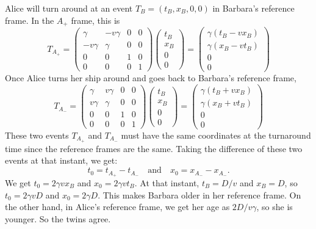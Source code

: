\documentclass{../../templates/lkx_pset}
\begin{document}
\begin{parts}
	Alice will turn around at an event $T_B = (t_B, x_B, 0, 0)$ in Barbara's reference frame. In the $A_+$ frame, this is 
	\[
		T_{A_+} = \begin{pmatrix}
				\gamma   & -v\gamma & 0 & 0 \\
				-v\gamma & \gamma   & 0 & 0 \\
				0        & 0        & 1 & 0 \\
				0        & 0        & 0 & 1
				\end{pmatrix}\begin{pmatrix} t_B\\x_B\\0\\0\end{pmatrix} = \begin{pmatrix}\gamma (t_B - v x_B)\\  \gamma (x_B - v t_B)\\0\\0\end{pmatrix}
	\]
	Once Alice turns her ship around and goes back to Barbara's reference frame, 
	\[
		T_{A_-} = \begin{pmatrix}
				\gamma   & v\gamma & 0 & 0 \\
				v\gamma & \gamma   & 0 & 0 \\
				0        & 0        & 1 & 0 \\
				0        & 0        & 0 & 1
				\end{pmatrix}\begin{pmatrix} t_B\\x_B\\0\\0\end{pmatrix} = \begin{pmatrix}\gamma (t_B + v x_B)\\  \gamma (x_B + v t_B)\\0\\0\end{pmatrix}
	\]
	These two events $T_{A_+}$ and $T_{A_-}$ must have the same coordinates at the turnaround time since the reference frames are the same. Taking the difference of these two events at that instant, we get:
	\[
		t_0 = t_{A_+} - t_{A_-} \quad\textrm{and}\quad x_0 = x_{A_-} - x_{A_-}.
	\]
	We get $t_0 = 2\gamma v x_B$ and $x_0=2\gamma v t_B$. At that instant, $t_B= D/v$ and $x_B = D$, so $t_0 = 2\gamma vD$ and $x_0 = 2\gamma D$. This makes Barbara older in her reference frame. On the other hand, in Alice's reference frame, we get her age as $2D/v\gamma$, so she is younger. So the twins agree.
\end{parts}
\end{document}
